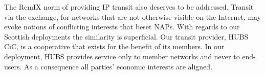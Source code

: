 

The RemIX norm of providing IP transit also deserves to be addressed. Transit
via the exchange, for networks that are not otherwise visible on the Internet,
may evoke notions of conflicting interests that beset \acp{NAP}.  With regards
to our Scottish deployments the similarity is superficial. Our transit provider,
HUBS CiC, is a cooperative that exists for the benefit of its members. In our
deployment, HUBS provides service only to member networks and never to
end-users. As a consequence all parties' economic interests are aligned.
